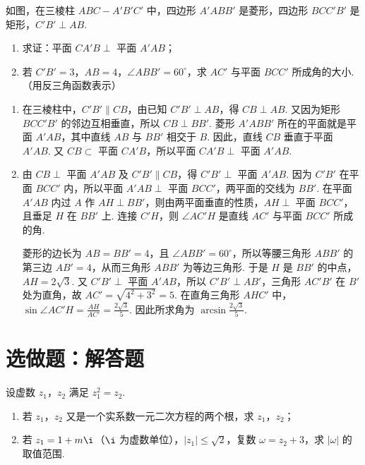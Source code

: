 \begin{problem}
如图，在三棱柱 \(ABC-A'B'C'\) 中，四边形 \(A'ABB'\) 是菱形，四边形 \(BCC'B'\) 是矩形，\(C'B' \perp AB\).

\begin{enumerate}
\item 求证：平面 \(CA'B \perp\) 平面 \(A'AB\)；
\item 若 \(C'B' = 3\)，\(AB = 4\)，\(\angle ABB' = 60^{\circ}\)，求 \(AC'\) 与平面 \(BCC'\) 所成角的大小.（用反三角函数表示）
\end{enumerate}

\end{problem}

\begin{solution}
\begin{enumerate}
\item 在三棱柱中，\(C'B'\parallel CB\)，由已知 \(C'B'\perp AB\)，得 \(CB\perp AB\). 又因为矩形 \(BCC'B'\) 的邻边互相垂直，所以 \(CB\perp BB'\). 菱形 \(A'ABB'\) 所在的平面就是平面 \(A'AB\)，其中直线 \(AB\) 与 \(BB'\) 相交于 \(B\). 因此，直线 \(CB\) 垂直于平面 \(A'AB\). 又 \(CB\subset\) 平面 \(CA'B\)，所以平面 \(CA'B\perp\) 平面 \(A'AB\).
\item 由 \(CB\perp\) 平面 \(A'AB\) 及 \(C'B'\parallel CB\)，得 \(C'B'\perp\) 平面 \(A'AB\). 因为 \(C'B'\) 在平面 \(BCC'\) 内，所以平面 \(A'AB\perp\) 平面 \(BCC'\)，两平面的交线为 \(BB'\). 在平面 \(A'AB\) 内过 \(A\) 作 \(AH\perp BB'\)，则由两平面垂直的性质，\(AH\perp\) 平面 \(BCC'\)，且垂足 \(H\) 在 \(BB'\) 上. 连接 \(C'H\)，则 \(\angle AC'H\) 是直线 \(AC'\) 与平面 \(BCC'\) 所成的角.

菱形的边长为 \(AB=BB'=4\)，且 \(\angle ABB'=60^{\circ}\)，所以等腰三角形 \(ABB'\) 的第三边 \(AB'=4\)，从而三角形 \(ABB'\) 为等边三角形. 于是 \(H\) 是 \(BB'\) 的中点，\(AH=2\sqrt3\). 又 \(C'B'\perp\) 平面 \(A'AB\)，所以 \(C'B'\perp AB'\)，三角形 \(AC'B'\) 在 \(B'\) 处为直角，故 \(AC'=\sqrt{4^2+3^2}=5\). 在直角三角形 \(AHC'\) 中，\(\sin\angle AC'H=\frac{AH}{AC'}=\frac{2\sqrt3}{5}\). 因此所求角为 \(\arcsin\frac{2\sqrt3}{5}\).
\end{enumerate}
\end{solution}

\section{选做题：解答题}

\begin{problem}[A]
设虚数 \(z_{1}\)，\(z_{2}\) 满足 \(z_{1}^{2}=z_{2}\).

\begin{enumerate}
\item 若 \(z_{1}\)，\(z_{2}\) 又是一个实系数一元二次方程的两个根，求 \(z_{1}\)，\(z_{2}\)；
\item 若 \(z_{1}=1+m\i\)（\(\i\) 为虚数单位），\(|z_{1}|\leqslant\sqrt{2}\)，复数 \(\omega=z_{2}+3\)，求 \(|\omega|\) 的取值范围.
\end{enumerate}
\end{problem}


